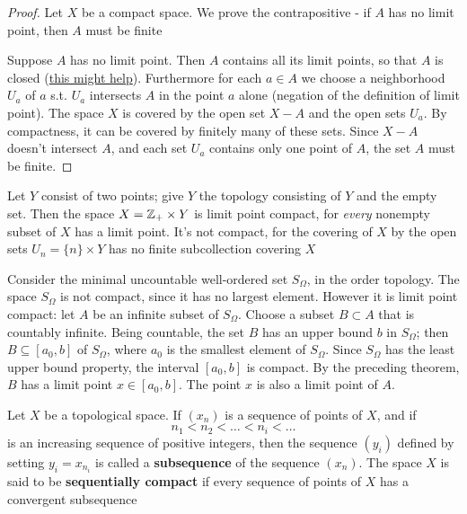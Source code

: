\documentclass[11pt]{article}
\begin{document}
\begin{proof}
Let \(X\) be a compact space. We prove the contrapositive - if \(A\) has no limit point,
then \(A\) must be finite

Suppose \(A\) has no limit point. Then \(A\) contains all its limit points, so that \(A\) is
closed (\href{https://math.stackexchange.com/questions/512769/help-in-proof-of-compactness-implies-limit-point-compactness}{this might help}). Furthermore for each \(a\in A\) we choose a neighborhood \(U_a\) of \(a\)
s.t. \(U_a\) intersects \(A\) in the point \(a\) alone (negation of the definition of limit
point). The space \(X\) is covered by the open
set \(X-A\) and the open sets \(U_a\). By compactness, it can be covered by finitely many of these
sets. Since \(X-A\) doesn't intersect \(A\), and each set \(U_a\) contains only one point
of \(A\), the set \(A\) must be finite.
\end{proof}

\begin{examplle}[]
Let \(Y\) consist of two points; give \(Y\) the topology consisting of \(Y\) and the empty set.
Then the space \(X=\mathbb{Z}_+\times Y\) is limit point compact, for \emph{every} nonempty subset of \(X\) has a limit
point. It's not compact, for the covering of \(X\) by the open sets \(U_n=\{n\}\times Y\) has no finite
subcollection covering \(X\)
\end{examplle}

\begin{examplle}[]
Consider the minimal uncountable well-ordered set \(S_\Omega\), in the order topology. The
space \(S_\Omega\) is not compact, since it has no largest element. However it is limit point compact:
let \(A\) be an infinite subset of \(S_\Omega\). Choose a subset \(B\subset A\) that is countably infinite.
Being countable, the set \(B\) has an upper bound \(b\) in \(S_\Omega\); then \(B\subseteq[a_0,b]\)
of \(S_\Omega\), where \(a_0\) is the smallest element of \(S_\Omega\). Since \(S_\Omega\) has the least upper
bound property, the interval \([a_0,b]\) is compact. By the preceding theorem, \(B\) has a limit
point \(x\in[a_0,b]\). The point \(x\) is also a limit point of \(A\).
\end{examplle}

\begin{definition}[]
Let \(X\) be a topological space. If \((x_n)\) is a sequence of points of \(X\), and if
\begin{equation*}
n_1<n_2<\dots<n_i<\dots
\end{equation*}
is an increasing sequence of positive integers, then the sequence \((y_i)\) defined by
setting \(y_i=x_{n_i}\) is called a \textbf{subsequence} of the sequence \((x_n)\). The space \(X\) is said
to be \textbf{sequentially compact} if every sequence of points of \(X\) has a convergent subsequence
\end{definition}
\end{document}
